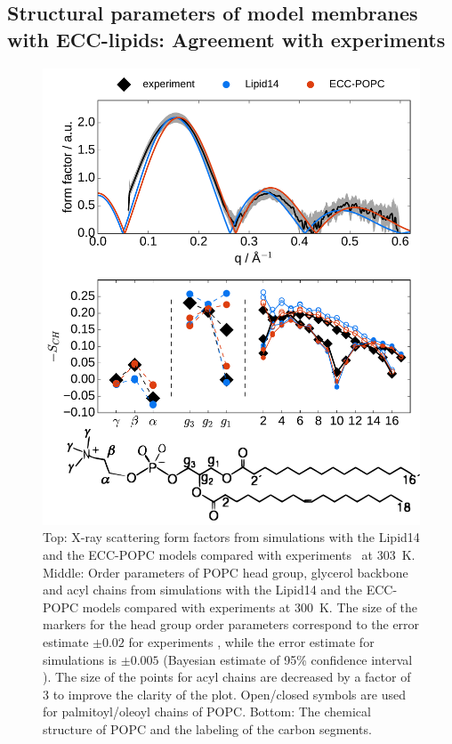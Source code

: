 \subsection{Structural parameters of model membranes with ECC-lipids: Agreement with experiments} 
 
\begin{figure}[tb!] 
  \centering 
  \includegraphics[width=\figwidth]{../img/ecc_popc/Order-parameters_form-factors_exp-L14-ECCL17_q80_sig89_POPC-struct.pdf} 
  \caption{ \label{simVSexpNOions} 
    Top: X-ray scattering form factors from simulations with the Lipid14 \citep{dickson14} and 
    the ECC-POPC \citep{melcr18} models compared with experiments~\citep{kucerka11} at 303~K. 
    Middle: Order parameters of POPC head group, glycerol backbone and acyl chains  
    from simulations with the Lipid14 and the ECC-POPC models 
    compared with experiments \citep{ferreira13} at 300~K. 
    The size of the markers for the head group order parameters correspond to 
    the error estimate $\pm 0.02$ for experiments \citep{botan15,ollila16}, 
    while the error estimate for simulations is $\pm 0.005$
    (Bayesian estimate of 95\% confidence interval \citep{scipy}).
    The size of the points for acyl chains are decreased by a factor of 3 to improve the clarity of the plot.
    Open/closed symbols are used for palmitoyl/oleoyl chains of POPC. 
    Bottom: The chemical structure of POPC and the labeling of the carbon segments. 
  }  
\end{figure} 


